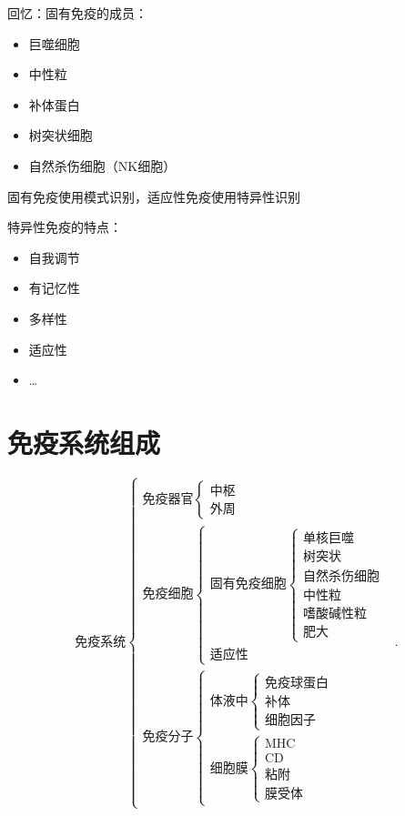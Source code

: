 回忆：固有免疫的成员：
\begin{itemize}
    \item 巨噬细胞
    \item 中性粒
    \item 补体蛋白
    \item 树突状细胞
    \item 自然杀伤细胞（NK细胞）
\end{itemize}
\begin{notation}
    固有免疫使用模式识别，适应性免疫使用特异性识别
\end{notation}
特异性免疫的特点：
\begin{itemize}
    \item 自我调节
    \item 有记忆性
    \item 多样性
    \item 适应性
    \item \ldots
\end{itemize}
\section{免疫系统组成}%
\label{sec:免疫系统组成}
\[
    \text{免疫系统}\begin{cases}
        \text{免疫器官}\begin{cases}
            \text{中枢}\\
            \text{外周}
        \end{cases}\\
        \text{免疫细胞}\begin{cases}
            \text{固有免疫细胞}\begin{cases}
                \text{单核巨噬}\\
                \text{树突状}\\
                \text{自然杀伤细胞}\\
                \text{中性粒}\\
                \text{嗜酸碱性粒}\\
                \text{肥大}
            \end{cases}\\
            \text{适应性}
        \end{cases}\\
        \text{免疫分子}\begin{cases}
            \text{体液中}\begin{cases}
                \text{免疫球蛋白}\\
                \text{补体}\\
                \text{细胞因子}
            \end{cases}\\
            \text{细胞膜}\begin{cases}
                \text{MHC}\\
                \text{CD}\\
                \text{粘附}\\
                \text{膜受体}
            \end{cases}
        \end{cases}
    \end{cases}
.\]
